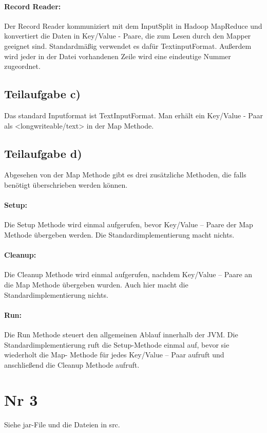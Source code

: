 \documentclass{article}
\begin{document}
\paragraph{Record Reader:}
Der Record Reader kommuniziert mit dem InputSplit in Hadoop MapReduce und konvertiert die Daten in Key/Value - Paare, die zum Lesen durch den Mapper geeignet sind. Standardmäßig verwendet es dafür TextinputFormat. Außerdem wird jeder in der Datei vorhandenen Zeile wird eine eindeutige Nummer zugeordnet.

\subsection{Teilaufgabe c)}
Das standard Inputformat ist TextInputFormat. Man erhält ein Key/Value - Paar als <longwriteable/text> in der Map Methode.

\subsection{Teilaufgabe d)}
Abgesehen von der Map Methode gibt es drei zusätzliche Methoden, die falls benötigt überschrieben werden können.

\paragraph{Setup:}
Die Setup Methode wird einmal aufgerufen, bevor Key/Value – Paare der Map Methode übergeben werden. Die Standardimplementierung macht nichts.

\paragraph{Cleanup:}
Die Cleanup Methode wird einmal aufgerufen, nachdem Key/Value – Paare an die Map Methode übergeben wurden. Auch hier macht die Standardimplementierung nichts.

\paragraph{Run:}
Die Run Methode steuert den allgemeinen Ablauf innerhalb der JVM. Die Standardimplementierung ruft die Setup-Methode einmal auf, bevor sie wiederholt die Map- Methode für jedes Key/Value – Paar aufruft und anschließend die Cleanup Methode aufruft.

\section{Nr 3}
Siehe jar-File und die Dateien in src.
\end{document}
